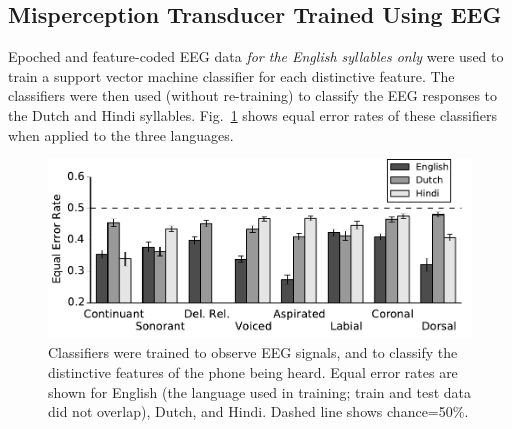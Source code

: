 \subsection{Misperception Transducer Trained Using EEG}
\label{ssec:eeg}

\newcommand{\specialcell}[2][c]{%
  \begin{tabular}[#1]{@{}c@{}}#2\end{tabular}}

Epoched and feature-coded EEG data {\em for the English syllables only}
were used to train a support vector machine classifier for each distinctive feature.
The classifiers were then used (without re-training) to classify the
EEG responses to the Dutch and Hindi syllables.
Fig.~\ref{fig:eeg_svm_eers} shows equal error rates of these
classifiers when applied to the three languages.

\begin{figure}
  \centerline{\includegraphics{../figs/eer-barplot/eer-barplot.pdf}}
  \vspace*{-0.3cm}
  \caption{Classifiers were trained to observe EEG signals, and to
    classify the distinctive features of the phone being heard.  Equal
    error rates are shown for English (the language used in training;
    train and test data did not overlap), Dutch, and Hindi.  Dashed
    line shows chance=50\%.}
  \label{fig:eeg_svm_eers}
\end{figure}

